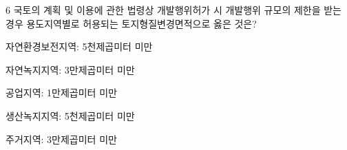 \begin{question}{6}
국토의 계획 및 이용에 관한 법령상 개발행위허가 시 개발행위 규모의 제한을 받는 경우 용도지역별로 허용되는 토지형질변경면적으로 옳은 것은?
\begin{choices}
  \item 자연환경보전지역: 5천제곱미터 미만
  \item 자연녹지지역: 3만제곱미터 미만
  \item 공업지역: 1만제곱미터 미만
  \item 생산녹지지역: 5천제곱미터 미만
  \item 주거지역: 3만제곱미터 미만
\end{choices}
\end{question}
